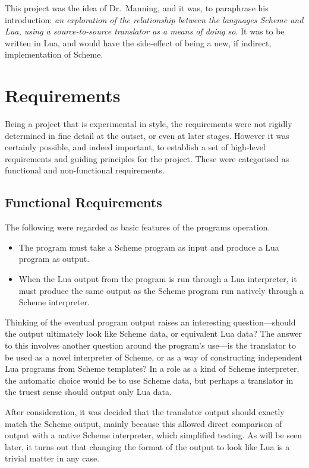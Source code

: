 This project was the idea of Dr.\ Manning, and it was, to paraphrase his
introduction: {\em an exploration of the relationship between
the languages Scheme and Lua, using a source-to-source translator as a means of
doing so}. It was to be written in Lua, and would have the side-effect of being
a new, if indirect, implementation of Scheme.


\section{Requirements}

Being a project that is experimental in style, the requirements were not rigidly
determined in fine detail at the outset, or even at later stages. However it was
certainly possible, and indeed important, to establish a set of high-level
requirements and guiding principles for the project. These were categorised as
functional and non-functional requirements.

\subsection{Functional Requirements}

The following were regarded as basic features of the programs operation.
\begin{itemize}
\item The program must take a Scheme program as input and produce a Lua program
as output.
\item When the Lua output from the program is run through a Lua interpreter, it
must produce the same output as the Scheme program run natively through a Scheme
interpreter.
\end{itemize}
\begin{framed}
Thinking of the eventual program output raises an interesting question---should
the output ultimately look like Scheme data, or equivalent Lua data?  The answer
to this involves another question around the program's use---is the translator
to be used as a novel interpreter of Scheme, or as a way of constructing
independent Lua programs from Scheme templates? In a role as a kind of Scheme
interpreter, the automatic choice would be to use Scheme data, but perhaps a
translator in the truest sense should output only Lua data.

After consideration, it was decided that the translator output should exactly
match the Scheme output, mainly because this allowed direct comparison of output
with a native Scheme interpreter, which simplified testing. As will be seen
later, it turns out that changing the format of the output to look like Lua is a
trivial matter in any case.
\end{framed}

